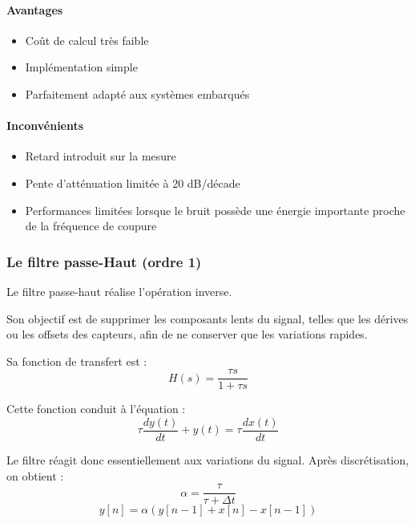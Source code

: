 \paragraph{Avantages}

\begin{itemize}
    \item Coût de calcul très faible
    \item Implémentation simple
    \item Parfaitement adapté aux systèmes embarqués
\end{itemize}

\paragraph{Inconvénients}

\begin{itemize}
    \item Retard introduit sur la mesure
    \item Pente d'atténuation limitée à 20 dB/décade
    \item Performances limitées lorsque le bruit possède une énergie importante proche de la fréquence de coupure
\end{itemize}

\subsubsection{Le filtre passe-Haut (ordre 1)}
\label{sec:filtre_passe_haut}

Le filtre passe-haut réalise l'opération inverse.

Son objectif est de supprimer les composants lents du signal, telles que les dérives ou les offsets des capteurs, afin de ne conserver que les variations rapides.

Sa fonction de transfert est :
\begin{equation}
    H(s) = \frac{\tau s}{1 + \tau s}
\end{equation}

Cette fonction conduit à l'équation :
\begin{equation}
    \tau \frac{dy(t)}{dt} + y(t) = \tau \frac{dx(t)}{dt}
\end{equation}

Le filtre réagit donc essentiellement aux variations du signal. Après discrétisation, on obtient :
\begin{equation}
    \alpha = \frac{\tau}{\tau + \Delta t}
\end{equation}
\begin{equation}
    y[n] = \alpha (y[n-1] + x[n] - x[n-1])
\end{equation}

